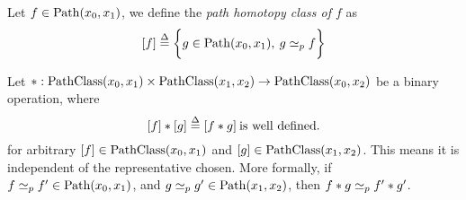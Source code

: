 \documentclass[../main-manifolds.tex]{subfiles}
\begin{document}
\begin{definition}
    Let $ f\in\Path[x_0,x_1]$, we define the \emph{path homotopy class of $f$} as 
    \[
        [f]\defined\bigset{g\in\Path[x_0,x_1],\: g\phtp f}
    \]
\end{definition}
\begin{definition}\label{munkres:product-of-pathclasses}
    Let $\cnv: \PathClass[x_0,x_1]\times\PathClass[x_1,x_2]\to \PathClass[x_0,x_2]$ be a binary operation, where 
    \[
        [f]\ast[g]\overset{\Delta}{=} [f\ast g]\: {\text{is well defined.}}
    \]
    for arbitrary $[f]\in \PathClass[x_0,x_1]$ and $[g]\in \PathClass[x_1,x_2]$. This means it is independent of the representative chosen. More formally, if $f\phtp f'\in\Path[x_0,x_1]$, and $g\phtp g'\in\Path[x_1,x_2]$, then $f\ast g\simeq_p f'\ast g'$.
\end{definition}
\end{document}
